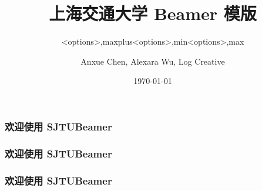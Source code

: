 \documentclass[
    aspectratio=169
]{ctexbeamer}
\begin{document}
\title[SJTU Beamer Template] %
{\textbf{上海交通大学 Beamer 模版}} %

\author[Anxue Chen, Alexara Wu, Log Creative]
{Anxue Chen, Alexara Wu, Log Creative}


\date{\today}

\subtitle{<options>,maxplus}
\logo{\resizebox{!}{0.7cm}{\cnlogo}}
\maketitle[maxplus]
\begin{frame}
  \frametitle{欢迎使用 SJTUBeamer}
\end{frame}
\makebottom[maxplus]

\subtitle{<options>,min}
\logo{\resizebox{!}{0.7cm}{\enlogo}}
\maketitle[min]
\begin{frame}
  \frametitle{欢迎使用 SJTUBeamer}
\end{frame}
\makebottom[min]

\subtitle{<options>,max}
\logo{\resizebox{!}{1cm}{\sjtubadge}}
\titlegraphic{\sjtubg[opacity=0.2]}
\maketitle[max]
\begin{frame}
  \frametitle{欢迎使用 SJTUBeamer}
\end{frame}
\makebottom[max]
\end{document}
